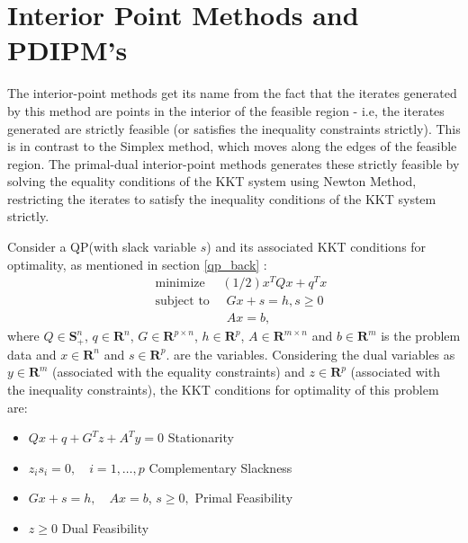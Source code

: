 \section{Interior Point Methods and PDIPM's}\label{IPM}
\par The interior-point methods get its name from the fact that the iterates generated by this method are points in the interior of the feasible region - i.e, the iterates generated are strictly feasible (or satisfies the inequality constraints strictly). This is in contrast to the Simplex method, which moves along the edges of the feasible region. The primal-dual interior-point methods generates these strictly feasible by solving the equality conditions of the KKT system using Newton Method, restricting the iterates to satisfy the inequality conditions of the KKT system strictly.\par
Consider a QP(with slack variable \(s\)) and its associated KKT conditions for optimality, as mentioned in section \ref{qp_back} :
\begin{equation}\label{qp-eqn}
\begin{aligned}
&\text { minimize } \quad(1 / 2) x^{T} Q x+q^{T} x\\
&\text { subject to } \quad G x+s=h,  s \geq 0\\
& \hspace{60pt} \quad A x=b, 
\end{aligned}
\end{equation}
\hspace{30pt}where $Q\in \mathbf{S}_{+}^{n}$, $q \in \mathbf{R}^{n}$, $G \in \mathbf{R}^{p \times n}$, $h \in \mathbf{R}^{p}$, $A \in \mathbf{R}^{m \times n}$ and $b \in \mathbf{R}^{m}$  is the problem data and $x \in \mathbf{R}^{n}$ and $s \in \mathbf{R}^{p}$. are the variables. Considering the dual variables as $y \in \mathbf{R}^{m}$ (associated with the equality constraints) and $z \in \mathbf{R}^{p}$ (associated with the inequality constraints), the KKT conditions for optimality of this problem are:
\begin{itemize}
\setlength\itemsep{0}
\item $Q x+q+G^{T} z+A^{T} y=0$ \hfill{Stationarity}
\item $z_{i} s_{i}=0, \quad i=1, \ldots, p$ \hfill{Complementary Slackness}
\item $G x+s=h, \quad A x=b$, $s \geq 0,$ \hfill{Primal Feasibility}
\item $z \geq 0$ \hfill{Dual Feasibility}
\end{itemize}\par
